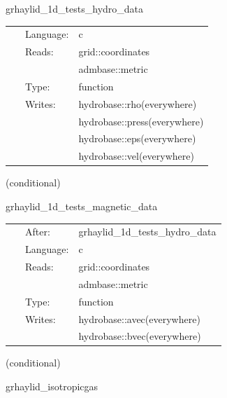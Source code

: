 \hspace{5mm} grhaylid\_1d\_tests\_hydro\_data 

\hspace{5mm}{\it set initial hydrodynamic data for 1d test } 


\hspace{5mm}

 \begin{tabular*}{160mm}{cll} 
~ & Language:  & c \\ 
~ & Reads:  & grid::coordinates \\ 
~& ~ &admbase::metric\\ 
~ & Type:  & function \\ 
~ & Writes:  & hydrobase::rho(everywhere) \\ 
~& ~ &hydrobase::press(everywhere)\\ 
~& ~ &hydrobase::eps(everywhere)\\ 
~& ~ &hydrobase::vel(everywhere)\\ 
\end{tabular*} 


\vspace{5mm}

   (conditional) 

\hspace{5mm} grhaylid\_1d\_tests\_magnetic\_data 

\hspace{5mm}{\it set initial magnetic data for 1d test } 


\hspace{5mm}

 \begin{tabular*}{160mm}{cll} 
~ & After:  & grhaylid\_1d\_tests\_hydro\_data \\ 
~ & Language:  & c \\ 
~ & Reads:  & grid::coordinates \\ 
~& ~ &admbase::metric\\ 
~ & Type:  & function \\ 
~ & Writes:  & hydrobase::avec(everywhere) \\ 
~& ~ &hydrobase::bvec(everywhere)\\ 
\end{tabular*} 


\vspace{5mm}

   (conditional) 

\hspace{5mm} grhaylid\_isotropicgas 

